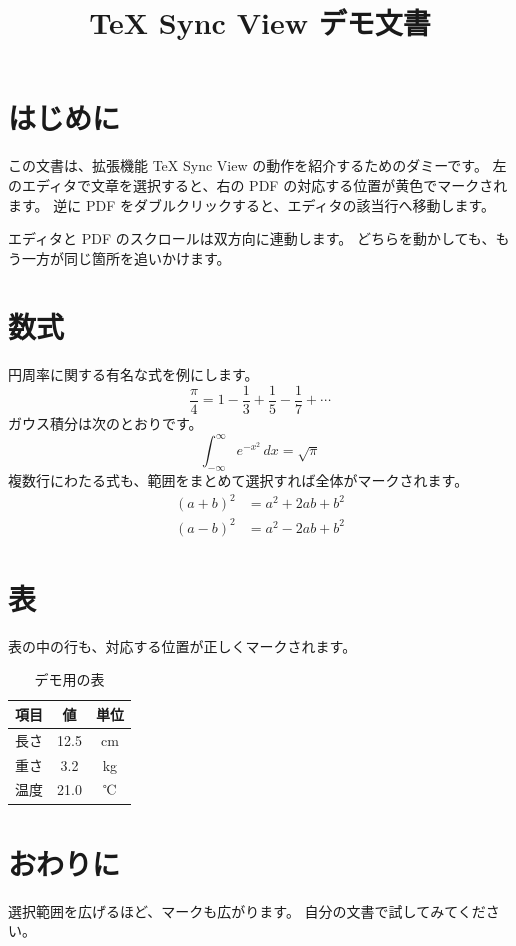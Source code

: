 \documentclass[a4paper,11pt]{jsarticle}
\title{TeX Sync View デモ文書}
\author{}
\date{}
\begin{document}
\maketitle

\section{はじめに}
この文書は、拡張機能 TeX Sync View の動作を紹介するためのダミーです。
左のエディタで文章を選択すると、右の PDF の対応する位置が黄色でマークされます。
逆に PDF をダブルクリックすると、エディタの該当行へ移動します。

エディタと PDF のスクロールは双方向に連動します。
どちらを動かしても、もう一方が同じ箇所を追いかけます。

\section{数式}
円周率に関する有名な式を例にします。
\begin{equation}
  \frac{\pi}{4} = 1 - \frac{1}{3} + \frac{1}{5} - \frac{1}{7} + \cdots
\end{equation}
ガウス積分は次のとおりです。
\begin{equation}
  \int_{-\infty}^{\infty} e^{-x^2}\,dx = \sqrt{\pi}
\end{equation}
複数行にわたる式も、範囲をまとめて選択すれば全体がマークされます。
\begin{align}
  (a+b)^2 &= a^2 + 2ab + b^2 \\
  (a-b)^2 &= a^2 - 2ab + b^2
\end{align}

\section{表}
表の中の行も、対応する位置が正しくマークされます。
\begin{table}[h]
  \centering
  \begin{tabular}{lcc}
    \toprule
    項目 & 値 & 単位 \\
    \midrule
    長さ & 12.5 & cm \\
    重さ & 3.2 & kg \\
    温度 & 21.0 & ℃ \\
    \bottomrule
  \end{tabular}
  \caption{デモ用の表}
\end{table}

\section{おわりに}
選択範囲を広げるほど、マークも広がります。
自分の文書で試してみてください。
\end{document}
